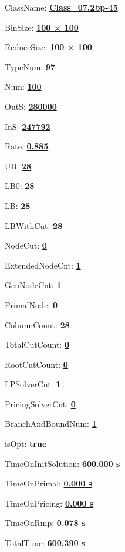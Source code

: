 \documentclass[11pt]{article}
\begin{document}
\pagestyle{empty}


ClassName: \underline{\textbf{Class_07.2bp-45}}
\par
BinSize: \underline{\textbf{100 × 100}}
\par
ReduceSize: \underline{\textbf{100 × 100}}
\par
TypeNum: \underline{\textbf{97}}
\par
Num: \underline{\textbf{100}}
\par
OutS: \underline{\textbf{280000}}
\par
InS: \underline{\textbf{247792}}
\par
Rate: \underline{\textbf{0.885}}
\par
UB: \underline{\textbf{28}}
\par
LB0: \underline{\textbf{28}}
\par
LB: \underline{\textbf{28}}
\par
LBWithCut: \underline{\textbf{28}}
\par
NodeCut: \underline{\textbf{0}}
\par
ExtendedNodeCnt: \underline{\textbf{1}}
\par
GenNodeCnt: \underline{\textbf{1}}
\par
PrimalNode: \underline{\textbf{0}}
\par
ColumnCount: \underline{\textbf{28}}
\par
TotalCutCount: \underline{\textbf{0}}
\par
RootCutCount: \underline{\textbf{0}}
\par
LPSolverCnt: \underline{\textbf{1}}
\par
PricingSolverCnt: \underline{\textbf{0}}
\par
BranchAndBoundNum: \underline{\textbf{1}}
\par
isOpt: \underline{\textbf{true}}
\par
TimeOnInitSolution: \underline{\textbf{600.000 s}}
\par
TimeOnPrimal: \underline{\textbf{0.000 s}}
\par
TimeOnPricing: \underline{\textbf{0.000 s}}
\par
TimeOnRmp: \underline{\textbf{0.078 s}}
\par
TotalTime: \underline{\textbf{600.390 s}}
\par
\newpage


\end{document}
